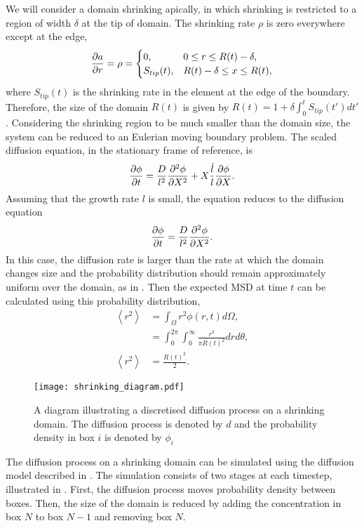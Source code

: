 We will consider a domain shrinking apically, in which shrinking is restricted to a region of width $\delta$ at the tip of domain. The shrinking rate $\rho$ is zero everywhere except at the edge,
%
\begin{equation}
\frac{\partial a}{\partial r} = \rho = \begin{cases}
		0, & 0 \leq r \leq R(t) - \delta, \\
		S_{tip}(t), & R(t) - \delta \leq x \leq R(t), \\
		\end{cases}
\end{equation}
%
where $S_{tip}(t)$ is the shrinking rate in the element at the edge of the boundary. Therefore, the size of the domain $R(t)$ is given by $R(t) = 1 + \delta \int_0^t S_{tip}(t')dt'$. Considering the shrinking region to be much smaller than the domain size, the system can be reduced to an Eulerian moving boundary problem. The scaled diffusion equation, in the stationary frame of reference, is
%
\begin{equation}
\frac{\partial \phi}{\partial t} = \frac{D}{l^2}\frac{\partial^2 \phi}{\partial X^2} + X \frac{\dot{l}}{l}\frac{\partial \phi}{\partial X}.
\end{equation}
%
Assuming that the growth rate $l$ is small, the equation reduces to the diffusion equation
%
\begin{equation}
\frac{\partial \phi}{\partial t} = \frac{D}{l^2}\frac{\partial^2 \phi}{\partial X^2}.
\end{equation}
%
In this case, the diffusion rate is larger than the rate at which
 the domain changes size and the probability distribution should remain
 approximately uniform over the domain, as in . Then the expected MSD at time $t$ can be calculated using this probability distribution,
 \begin{align}
 \left<r^2\right> 	&= \int_{\Omega}r^2 \phi(r,t) d\Omega ,\\
                 	&= \int_0^{2\pi}\int_0^{\infty} \frac{r^3}{\pi R(t)^2} dr d\theta, \\
 \left<r^2\right>	&= \frac{R(t)^2}{2} .
 \label{eqn:shrink_domain}
 \end{align}
   \begin{figure} [h]
       \centering
           \texttt{[image: shrinking\_diagram.pdf]}
           \caption{A diagram illustrating a discretised diffusion process on a shrinking domain. The diffusion process is denoted by $d$ and the probability density in box $i$ is denoted by $\phi_i$}
       \label{fig:shrinking_diagram}
   \end{figure}
%
The diffusion process on a shrinking domain can be simulated using the diffusion model described in . The simulation consists of two stages at each timestep, illustrated in . First, the diffusion process moves probability density between boxes. Then, the size of the domain is reduced by adding the concentration in box $N$ to box $N-1$ and removing box $N$.

